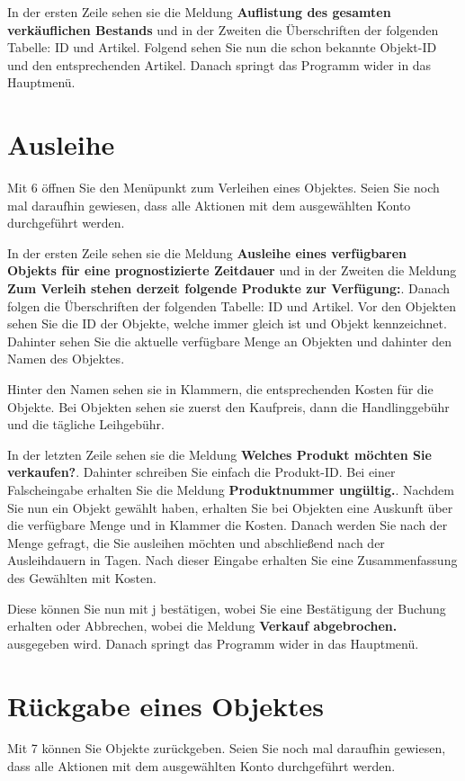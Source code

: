 ﻿\documentclass[a4paper,12pt,titlepage]{article}
\newcommand\enquote[1]{{\ttfamily \bfseries #1}}
\begin{document}
In der ersten Zeile sehen sie die Meldung \enquote{Auflistung des gesamten verkäuflichen Bestands}
 und in der Zweiten die Überschriften der folgenden Tabelle: ID und Artikel.
Folgend sehen Sie nun die schon bekannte Objekt-ID und den entsprechenden Artikel.
Danach springt das Programm wider in das Hauptmenü.

\section{Ausleihe}
Mit 6 öffnen Sie den Menüpunkt zum Verleihen eines Objektes.
Seien Sie noch mal daraufhin gewiesen, dass alle Aktionen mit dem ausgewählten Konto durchgeführt werden.

In der ersten Zeile sehen sie die Meldung \enquote{Ausleihe eines verfügbaren Objekts für eine prognostizierte Zeitdauer}
 und in der Zweiten die Meldung \enquote{Zum Verleih stehen derzeit folgende Produkte zur Verfügung:}.
Danach folgen die Überschriften der folgenden Tabelle: ID und Artikel.
Vor den Objekten sehen Sie die ID der Objekte, welche immer gleich ist und Objekt kennzeichnet. 
Dahinter sehen Sie die aktuelle verfügbare Menge an Objekten und dahinter den Namen des Objektes.

Hinter den Namen sehen sie in Klammern, die entsprechenden Kosten für die Objekte.
Bei Objekten sehen sie zuerst den Kaufpreis, dann die Handlinggebühr und die tägliche Leihgebühr.

In der letzten Zeile sehen sie die Meldung \enquote{Welches Produkt möchten Sie verkaufen?}.
Dahinter schreiben Sie einfach die Produkt-ID.
Bei einer Falscheingabe erhalten Sie die Meldung \enquote{Produktnummer ungültig.}.
Nachdem Sie nun ein Objekt gewählt haben,
 erhalten Sie bei Objekten eine Auskunft über die verfügbare Menge und in Klammer die Kosten.
Danach werden Sie nach der Menge gefragt, die Sie ausleihen möchten und abschließend nach der Ausleihdauern in Tagen.
Nach dieser Eingabe erhalten Sie eine Zusammenfassung des Gewählten mit Kosten.

Diese können Sie nun mit j bestätigen, wobei Sie eine Bestätigung der Buchung erhalten oder Abbrechen,
 wobei die Meldung \enquote{Verkauf abgebrochen.} ausgegeben wird.
Danach springt das Programm wider in das Hauptmenü.
\section{Rückgabe eines Objektes}
Mit 7 können Sie Objekte zurückgeben.
Seien Sie noch mal daraufhin gewiesen, dass alle Aktionen mit dem ausgewählten Konto durchgeführt werden.
\end{document}
